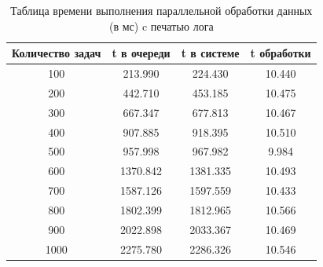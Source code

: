 \documentclass[12pt]{report}
\begin{document}
\begin{table} [h!]
	\caption{Таблица времени выполнения параллельной обработки данных (в мс) c печатью лога}
	\label{tableComp}
	\begin{center}
		\begin{tabular}{|c c c c|} 
		 	\hline
			Количество задач & t в очереди & t в системе & t обработки \\  
			\hline
            100 & 213.990 & 224.430 & 10.440 \\
            \hline
            200 & 442.710 & 453.185 & 10.475 \\
            \hline
            300 & 667.347 & 677.813 & 10.467 \\
            \hline
            400 & 907.885 & 918.395 & 10.510 \\
            \hline
            500 & 957.998 & 967.982 & 9.984 \\
            \hline
            600 & 1370.842 & 1381.335 & 10.493 \\
            \hline
            700 & 1587.126 & 1597.559 & 10.433 \\
            \hline
            800 & 1802.399 & 1812.965 & 10.566 \\
            \hline
            900 & 2022.898 & 2033.367 & 10.469 \\
            \hline
            1000 & 2275.780 & 2286.326 & 10.546 \\
			\hline
		\end{tabular}
	\end{center}
\end{table}
\end{document}
